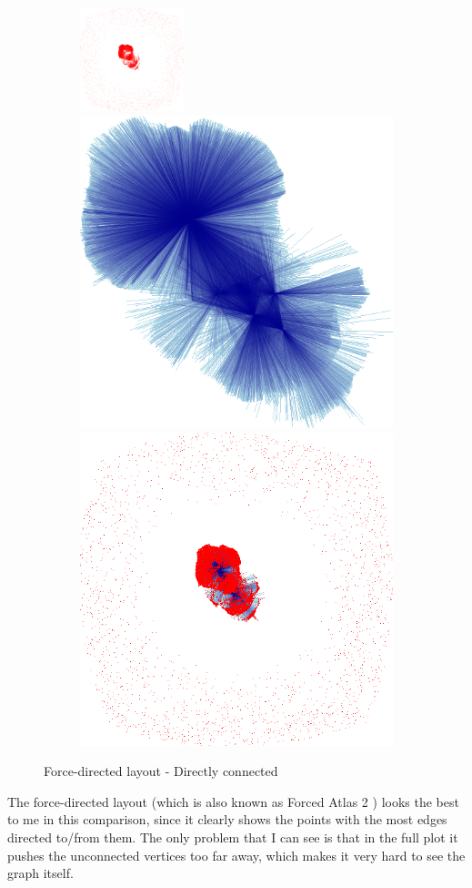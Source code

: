 \documentclass[12pt, a4paper]{article}
\begin{document}
\begin{figure}[H]
    \centering
    \begin{subfigure}[b]{\textwidth}
        \centering
        \includegraphics[width=0.33\textwidth]{src/youtube/datashader/simple/datashader/4_1}%
        \hfill
        \includegraphics[width=0.33\columnwidth]{src/youtube/datashader/simple/datashader/4_2}%
        \hfill
        \includegraphics[width=0.33\columnwidth]{src/youtube/datashader/simple/datashader/4_3}
    \end{subfigure}
    \caption{Force-directed layout - Directly connected}
    \label{fig:ds_show_4}
\end{figure}


The force-directed layout (which is also known as Forced Atlas 2 \cite{bastian2009gephi}) looks the best to me in this comparison, since it clearly shows the points with the most edges directed to/from them. The only problem that I can see is that in the full plot it pushes the unconnected vertices too far away, which makes it very hard to see the graph itself.



\end{document}
